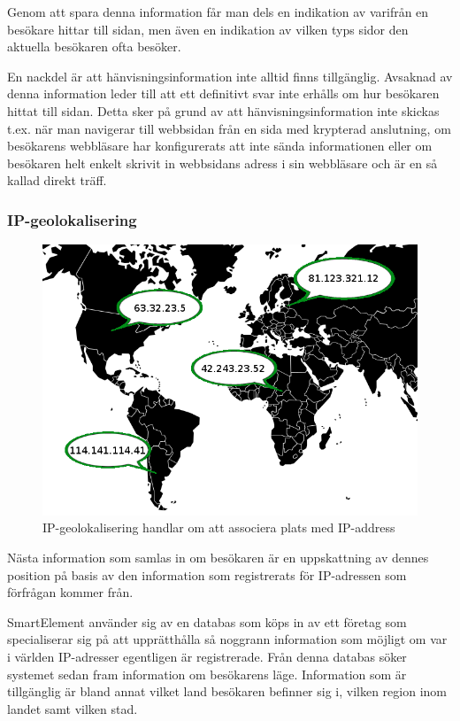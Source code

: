 Genom att spara denna information får man dels en indikation av varifrån en besökare hittar till sidan, men även en indikation av vilken typs sidor den aktuella besökaren ofta besöker.

En nackdel är att hänvisningsinformation inte alltid finns tillgänglig. Avsaknad av denna information leder till att ett definitivt svar inte erhålls om hur besökaren hittat till sidan. Detta sker på grund av att hänvisningsinformation inte skickas t.ex. när man navigerar till webbsidan från en sida med krypterad anslutning, om besökarens webbläsare har konfigurerats att inte sända informationen eller om besökaren helt enkelt skrivit in webbsidans adress i sin webbläsare och är en så kallad direkt träff. \citep{httprfc}

\subsubsection{IP-geolokalisering}

\begin{figure}[h!]
\centering
\includegraphics[width=120mm]{assets/images/geolocation.png}
\caption{IP-geolokalisering handlar om att associera plats med IP-address}
\label{geolocation}
\end{figure}

Nästa information som samlas in om besökaren är en uppskattning av dennes position på basis av den information som registrerats för IP-adressen som förfrågan kommer från.

SmartElement använder sig av en databas som köps in av ett företag som specialiserar sig på att upprätthålla så noggrann information som möjligt om var i världen IP-adresser egentligen är registrerade. Från denna databas söker systemet sedan fram information om besökarens läge. Information som är tillgänglig är bland annat vilket land besökaren befinner sig i, vilken region inom landet samt vilken stad.

